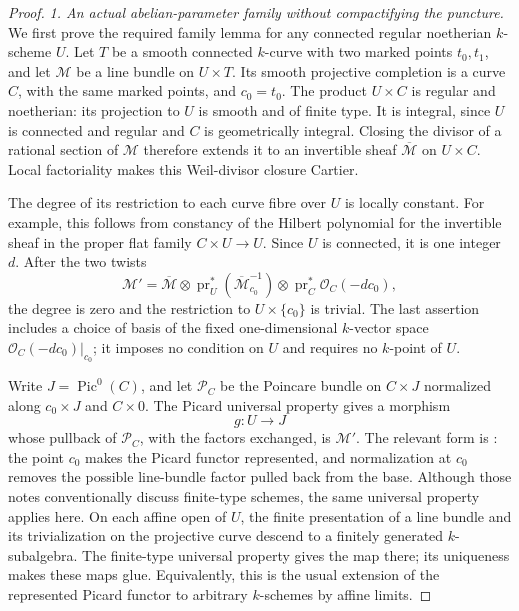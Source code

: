 \begin{proof}
\emph{1. An actual abelian-parameter family without
compactifying the puncture.}
We first prove the required family lemma for any
connected regular noetherian $k$-scheme $U$.
Let $T$ be a smooth connected $k$-curve with two
marked points $t_0,t_1$, and let $\mathcal M$ be
a line bundle on $U\times T$. Its smooth projective
completion is a curve $C$, with the same marked
points, and $c_0=t_0$. The product $U\times C$ is
regular and noetherian: its projection to $U$ is
smooth and of finite type. It is integral, since
$U$ is connected and regular and $C$ is
geometrically integral. Closing the divisor of a
rational section of $\mathcal M$ therefore extends
it to an invertible sheaf $\overline{\mathcal M}$
on $U\times C$. Local factoriality makes this
Weil-divisor closure Cartier.

The degree of its restriction to each curve fibre
over $U$ is locally constant. For example, this
follows from constancy of the Hilbert polynomial
for the invertible sheaf in the proper flat family
$C\times U\to U$. Since $U$ is connected, it is
one integer $d$. After the two twists
\[
 \mathcal M'=
 \overline{\mathcal M}\otimes
 \operatorname{pr}_U^*
       (\overline{\mathcal M}_{c_0}^{-1})\otimes
 \operatorname{pr}_C^*\mathcal O_C(-d c_0),
\]
the degree is zero and the restriction to
$U\times\{c_0\}$ is trivial. The last assertion
includes a choice of basis of the fixed
one-dimensional $k$-vector space
$\mathcal O_C(-dc_0)|_{c_0}$; it imposes no
condition on $U$ and requires no $k$-point of $U$.

Write $J=\operatorname{Pic}^0(C)$, and let
$\mathcal P_C$ be the Poincare bundle on $C\times J$
normalized along $c_0\times J$ and $C\times0$.
The Picard universal property gives a morphism
\[
                         g:U\longrightarrow J
\]
whose pullback of $\mathcal P_C$, with the factors
exchanged, is $\mathcal M'$.
The relevant form is
\citet[Theorem 1.1 and Lemma 1.3, pp.~2--3]{D_MilneJacobians2021}:
the point $c_0$ makes the Picard functor represented,
and normalization at $c_0$ removes the possible
line-bundle factor pulled back from the base.
Although those notes conventionally discuss
finite-type schemes, the same universal property
applies here. On each affine open of $U$, the
finite presentation of a line bundle and its
trivialization on the projective curve descend
to a finitely generated $k$-subalgebra. The
finite-type universal property gives the map
there; its uniqueness makes these maps glue.
Equivalently, this is the usual extension of
the represented Picard functor to arbitrary
$k$-schemes by affine limits.


\end{proof}
